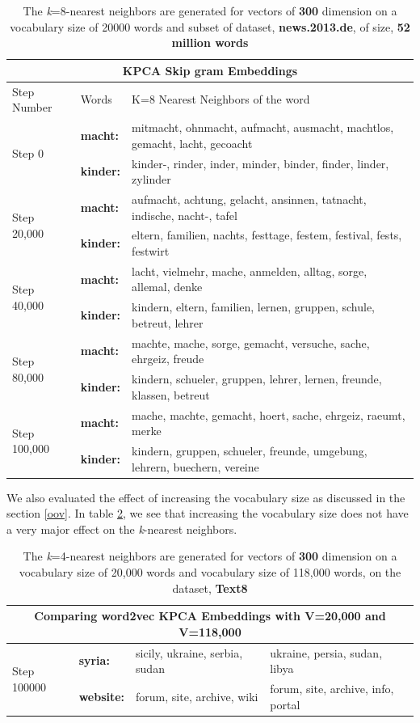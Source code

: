 \begin{table}
	\hskip-1.5cm
	\begin{tabular}{|l|l|l|}
		\hline
		\multicolumn{3}{|c|}{KPCA Skip gram Embeddings} \\
		\hline
		Step Number & Words & K=8 Nearest Neighbors of the word \\ \hline
		\multirow{2}{*}{Step 0}
		& \textbf{macht:} &mitmacht, ohnmacht, aufmacht, ausmacht, machtlos, gemacht, lacht, gecoacht\\
		& \textbf{kinder:} &kinder-, rinder, inder, minder, binder, finder, linder, zylinder\\ 
		\hline
		\multirow{2}{*}{Step 20,000} 
		& \textbf{macht:} &aufmacht, achtung, gelacht, ansinnen, tatnacht, indische, nacht-, tafel\\
		& \textbf{kinder:} &eltern, familien, nachts, festtage, festem, festival, fests, festwirt\\ 
		\hline
		\multirow{2}{*}{Step 40,000} 
		& \textbf{macht:} &lacht, vielmehr, mache, anmelden, alltag, sorge, allemal, denke\\
		& \textbf{kinder:} &kindern, eltern, familien, lernen, gruppen, schule, betreut, lehrer\\ 
		\hline
		\multirow{2}{*}{Step 80,000} 
		& \textbf{macht:} &machte, mache, sorge, gemacht, versuche, sache, ehrgeiz, freude\\
		& \textbf{kinder:} &kindern, schueler, gruppen, lehrer, lernen, freunde, klassen, betreut\\ 
		\hline
		\multirow{2}{*}{Step 100,000} 
		& \textbf{macht:} &mache, machte, gemacht, hoert, sache, ehrgeiz, raeumt, merke\\
		& \textbf{kinder:}&kindern, gruppen, schueler, freunde, umgebung, lehrern, buechern, vereine\\ 
		\hline
	\end{tabular}
	\caption{The \textit{k}=8-nearest neighbors are generated for vectors of \textbf{300} dimension on a vocabulary size of 20000 words and subset of dataset, \textbf{news.2013.de}, of size, \textbf{52 million words}}\label{table:14}
\end{table}
We also evaluated the effect of increasing the vocabulary size as discussed in the section \ref{oov}. In table \ref{table:15}, we see that increasing the vocabulary size does not have a very major effect on the \textit{k}-nearest neighbors.
\begin{table}[H]
\begin{tabular}[htbp]{|l|l|l|l|}	
	\hline
	\multicolumn{4}{|c|}{\textbf{Comparing word2vec KPCA Embeddings with V=20,000 and V=118,000}} \\
	\hline
	\multirow{2}{*}{Step 100000}& \textbf{syria:}& sicily, ukraine, serbia, sudan& ukraine, persia, sudan, libya\\
	& \textbf{website:}& forum, site, archive, wiki &forum, site, archive, info, portal\\
	\hline
\end{tabular}
\caption{The \textit{k}=4-nearest neighbors are generated for vectors of \textbf{300} dimension on a vocabulary size of 20,000 words and vocabulary size of 118,000 words, on the dataset, \textbf{Text8}}
\label{table:15}
\end{table}
